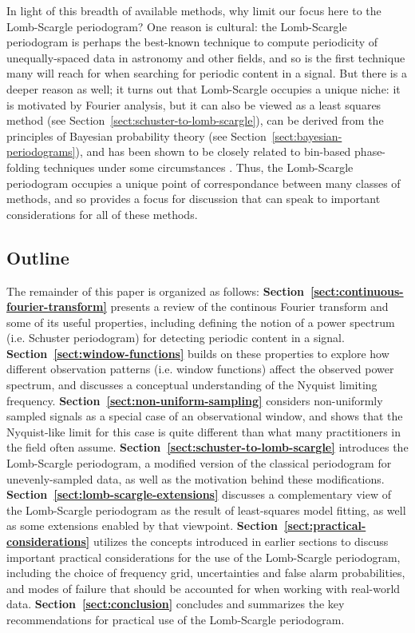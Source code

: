 \documentclass[preprint]{aastex}
\newcommand{\Sect}[1]{Section~\ref{sect:#1}}
\newcommand{\sect}[1]{\Sect{#1}}
\begin{document}
In light of this breadth of available methods, why limit our focus here to the
Lomb-Scargle periodogram?
One reason is cultural: the Lomb-Scargle periodogram is perhaps the best-known
technique to compute periodicity of unequally-spaced data in astronomy and
other fields, and so is the first technique many will reach for
when searching for periodic content in a signal.
But there is a deeper reason as well; it turns out that Lomb-Scargle occupies
a unique niche: it is motivated by Fourier analysis,
but it can also be viewed as a least squares method
(see \sect{schuster-to-lomb-scargle}), can be derived from the principles
of Bayesian probability theory (see \sect{bayesian-periodograms}), and has
been shown to be closely related to bin-based phase-folding techniques under
some circumstances \citep[see][]{Swingler89}.
Thus, the Lomb-Scargle periodogram occupies a unique point of correspondance
between many classes of methods, and so provides a focus for discussion that
can speak to important considerations for all of these methods.

\subsection{Outline}
The remainder of this paper is organized as follows:
{\bf\sect{continuous-fourier-transform}} presents a review of the
continous Fourier transform and some of its useful properties,
including defining the notion of a power spectrum (i.e. Schuster
periodogram) for detecting periodic content in a signal.
{\bf\sect{window-functions}} builds on these properties to explore how
different observation patterns (i.e. window functions) affect the observed
power spectrum, and discusses a conceptual understanding of the
Nyquist limiting frequency.
{\bf\sect{non-uniform-sampling}} considers non-uniformly sampled signals as
a special case of an observational window, and shows that the Nyquist-like
limit for this case is quite different than what many practitioners in
the field often assume.
{\bf\sect{schuster-to-lomb-scargle}} introduces the Lomb-Scargle periodogram,
a modified version of the classical periodogram for unevenly-sampled data,
as well as the motivation behind these modifications.
{\bf\sect{lomb-scargle-extensions}} discusses a complementary view of the
Lomb-Scargle periodogram as the result of least-squares model fitting,
as well as some extensions enabled by that viewpoint.
{\bf\sect{practical-considerations}} utilizes the concepts introduced
in earlier sections to discuss important practical considerations for
the use of the Lomb-Scargle periodogram, including the choice of
frequency grid, uncertainties and false alarm probabilities, and modes of
failure that should be accounted for when working with real-world data.
{\bf\sect{conclusion}} concludes and summarizes the key recommendations
for practical use of the Lomb-Scargle periodogram.
\end{document}
